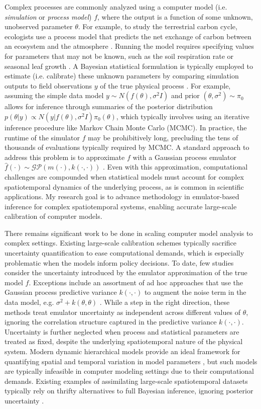 \documentclass[11pt]{article}
\begin{document}
Complex processes are commonly analyzed using a computer model (i.e. \textit{simulation} or \textit{process model}) $f$, where the output is a function of some unknown, unobserved parameter $\theta$.
For example, to study the terrestrial carbon cycle, ecologists use a process model 
that predicts the net exchange of carbon between an ecosystem and the atmosphere \cite{Fer}. Running the model requires specifying values for parameters that 
may not be known, such as the soil respiration rate or seasonal leaf growth \cite{Fer}. A Bayesian statistical formulation is typically employed to estimate (i.e. calibrate) these unknown parameters by comparing simulation outputs to field observations $y$ of the true physical process \cite{Kennedy}. For example, assuming the simple data model $y \sim N(f(\theta), \sigma^2 I)$ and prior $(\theta, \sigma^2) \sim \pi_0$ allows for inference through summaries of the posterior distribution $p(\theta|y) \propto N(y|f(\theta), \sigma^2 I)\pi_0(\theta)$, which typically involves using an iterative inference procedure like Markov Chain Monte Carlo (MCMC). In practice, the runtime of the simulator $f$ may be prohibitively long, precluding the tens of thousands of evaluations typically required by MCMC. A standard approach to address this problem is to approximate $f$ with a Gaussian process emulator $\hat{f}(\cdot) \sim \mathcal{GP}(m(\cdot), k(\cdot, \cdot))$ \cite{Fer, Kennedy, Cleary}. Even with this approximation, computational challenges are compounded when statistical models must account for complex spatiotemporal dynamics of the underlying process, as is common in scientific applications. My research goal is to advance methodology in emulator-based inference for complex spatiotemporal systems, enabling accurate large-scale calibration of computer models.

 There remains significant work to be done in scaling computer model analysis to complex settings. Existing large-scale calibration schemes typically sacrifice uncertainty quantification to ease computational demands, which is especially problematic when the models inform policy decisions. To date, few studies consider the uncertainty introduced by the emulator approximation of the true model $f$. Exceptions include an assortment of ad hoc approaches that use the Gaussian process predictive variance $k(\cdot, \cdot)$ to augment the 
 noise term in the data model, e.g. $\sigma^2 + k(\theta, \theta)$ \cite{Fer, Cleary}. While a step in the right direction, these methods treat emulator uncertainty as independent across different values of $\theta$, ignoring the correlation structure captured in the predictive variance $k(\cdot, \cdot)$. Uncertainty is further neglected when process and statistical parameters are treated as fixed, despite the underlying spatiotemporal nature of the physical system. Modern dynamic hierarchical models provide an ideal framework for quantifying spatial and temporal variation in model parameters \cite{Wikle}, but such models are typically infeasible in computer modeling settings due to their computational demands. Existing examples of assimilating large-scale spatiotemporal datasets typically rely on thrifty alternatives to full Bayesian inference, ignoring posterior uncertainty \cite{Sun}.
 
\end{document}
